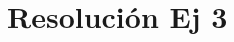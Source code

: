 \documentclass[twocolumn,aps,prl]{revtex4-1}
\begin{document}


\section{Resolución Ej 3}
\end{document}
